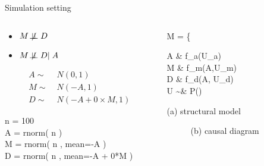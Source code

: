 %
%
\begin{frame}
	{Simulation setting}
	\begin{columns}
		\begin{column}{0.5\textwidth}
			\begin{itemize}
				\item $M \not\!\perp\!\!\!\perp D$
				\item $M \not\!\perp\!\!\!\perp D | \; A$
			\end{itemize}
			\begin{align*}
				A \sim & \; N(0, 1) \\
				M \sim & \; N(-A, 1) \\
				D \sim & \; N(-A + 0 \times M, 1)
			\end{align*}
			
			\begin{codesnippet}[\textwidth]
				n = 100 \\
				A = rnorm( n ) \\
				M = rnorm( n , mean=-A ) \\
				D = rnorm( n , mean=-A + 0*M ) 
			\end{codesnippet}
		\end{column}
		\begin{column}{0.5\textwidth}  
			\begin{equ}
				M = \left\{ \begin{aligned} 
					A \leftarrow & \; f_{a}(U_{a}) \\
					M \leftarrow & \; f_{m}(A,U_{m}) \\
					D \leftarrow & \; f_{d}(A, U_{d}) \\
					U \sim & \; P()
				\end{aligned} \right
				\caption*{(a) structural model}
			\end{equ}
			\begin{figure}
				\caption*{(b) causal diagram}
			\end{figure}
		\end{column}
	\end{columns}
\end{frame}

